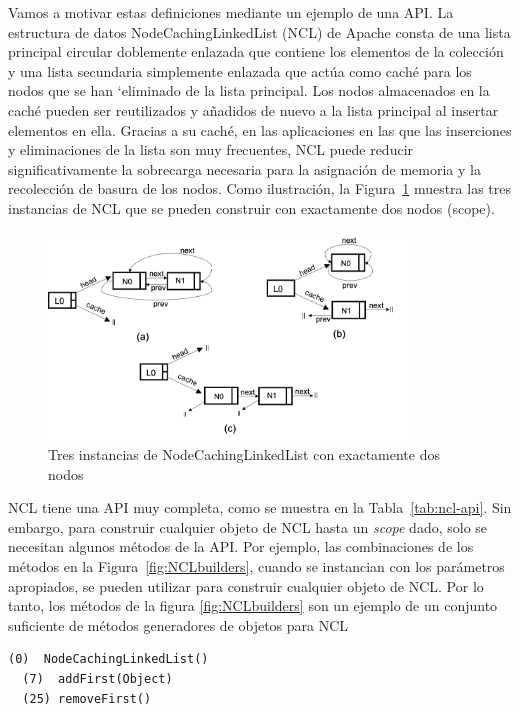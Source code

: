 Vamos a motivar estas definiciones mediante un ejemplo de una API. La estructura de datos NodeCachingLinkedList (NCL) de Apache \cite{apache} consta de una lista principal circular doblemente enlazada que contiene los elementos de la colección y una lista secundaria simplemente enlazada que actúa como caché para los nodos que se han `eliminado de la lista principal. Los nodos almacenados en la caché pueden ser reutilizados y añadidos de nuevo a la lista principal al insertar elementos en ella. Gracias a su caché, en las aplicaciones en las que las inserciones y eliminaciones de la lista son muy frecuentes, NCL puede reducir significativamente la sobrecarga necesaria para la asignación de memoria y la recolección de basura de los nodos. 
Como ilustración, la Figura~\ref{fig:ncl-instances} muestra las tres instancias de NCL que se pueden construir con exactamente dos nodos (scope).

\begin{figure}[H]
    \centering
    \includegraphics[width=0.85\textwidth]{NCL-instances.png}
    \caption{Tres instancias de NodeCachingLinkedList con exactamente dos nodos}
    \label{fig:ncl-instances}
\end{figure}


NCL tiene una API muy completa, como se muestra en la Tabla~\ref{tab:ncl-api}.
Sin embargo, para construir cualquier objeto de NCL hasta un \emph{scope} dado, solo se necesitan algunos métodos de la API. Por ejemplo, las combinaciones de los métodos en la Figura~\ref{fig:NCLbuilders}, cuando se instancian con los parámetros
apropiados, se pueden utilizar para construir cualquier objeto de NCL.
Por lo tanto, los métodos de la figura \ref{fig:NCLbuilders} son un ejemplo de un conjunto suficiente de métodos generadores de objetos para NCL
\\
\begin{lstlisting}[numbers=none,label=fig:NCLbuilders, caption=Conjunto de metodos sufiente para NCL]
  (0)  NodeCachingLinkedList()
  (7)  addFirst(Object)
  (25) removeFirst()
\end{lstlisting}

